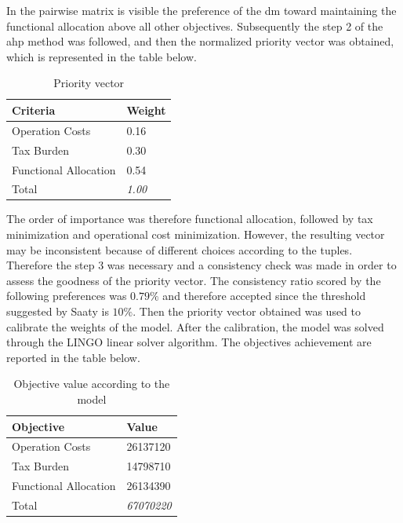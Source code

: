 \begin{doublespace}
In the pairwise matrix is visible the preference of the \gls{dm} toward maintaining the functional allocation above all other objectives. Subsequently the step 2 of the \gls{ahp} method was followed, and then the normalized priority vector was obtained, which is represented in the table below.

\begin{table}[]
\centering
\begin{tabular}{@{}ll@{}}
\toprule
\textbf{Criteria}     & Weight        \\ \midrule
Operation Costs       & 0.16          \\
Tax Burden            & 0.30          \\
Functional Allocation & 0.54          \\
Total                 & \textit{1.00} \\ \bottomrule
\end{tabular}
\caption{Priority vector}
\end{table}

The order of importance was therefore functional allocation, followed by tax minimization and operational cost minimization. However, the resulting vector may be inconsistent because of different choices according to the tuples. Therefore the step 3 was necessary and a consistency check was made in order to assess the goodness of the priority vector.
The consistency ratio scored by the following preferences was $0.79\%$ and therefore accepted since the threshold suggested by Saaty\cite{Saaty1980} is $10\%$. Then the priority vector obtained was used to calibrate the weights of the model. After the calibration, the model was solved through the LINGO\cite{Cunningham2004} linear solver algorithm. The objectives achievement are reported in the table below.

\begin{table}[]
\centering
\begin{tabular}{@{}ll@{}}
\toprule
\textbf{Objective}    & Value         \\ \midrule
Operation Costs       & 26137120     \\
Tax Burden	      & 14798710     \\
Functional Allocation & 26134390     \\
Total                 & \textit{67070220} \\ \bottomrule
\end{tabular}
\caption{Objective value according to the model}
\end{table}


\end{doublespace}
